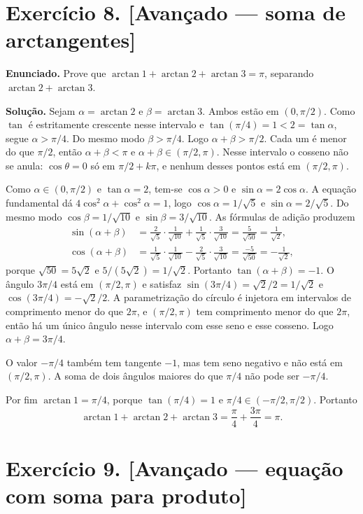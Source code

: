 \documentclass[11pt,a4paper]{article}
\begin{document}
\section*{Exercício 8. [Avançado --- soma de arctangentes]}

\textbf{Enunciado.} Prove que $\arctan 1+\arctan 2+\arctan 3=\pi$, separando $\arctan 2+\arctan 3$.

\textbf{Solução.}
Sejam $\alpha=\arctan 2$ e $\beta=\arctan 3$. Ambos estão em $(0,\pi/2)$. Como $\tan$ é estritamente crescente nesse intervalo e $\tan(\pi/4)=1<2=\tan\alpha$, segue $\alpha>\pi/4$. Do mesmo modo $\beta>\pi/4$. Logo $\alpha+\beta>\pi/2$. Cada um é menor do que $\pi/2$, então $\alpha+\beta<\pi$ e $\alpha+\beta\in(\pi/2,\pi)$. Nesse intervalo o cosseno não se anula: $\cos\theta=0$ só em $\pi/2+k\pi$, e nenhum desses pontos está em $(\pi/2,\pi)$.

Como $\alpha\in(0,\pi/2)$ e $\tan\alpha=2$, tem-se $\cos\alpha>0$ e $\sin\alpha=2\cos\alpha$. A equação fundamental dá $4\cos^2\alpha+\cos^2\alpha=1$, logo $\cos\alpha=1/\sqrt{5}$ e $\sin\alpha=2/\sqrt{5}$. Do mesmo modo $\cos\beta=1/\sqrt{10}$ e $\sin\beta=3/\sqrt{10}$. As fórmulas de adição produzem
\begin{align*}
\sin(\alpha+\beta)
&=\frac{2}{\sqrt{5}}\cdot\frac{1}{\sqrt{10}}+\frac{1}{\sqrt{5}}\cdot\frac{3}{\sqrt{10}}
=\frac{5}{\sqrt{50}}
=\frac{1}{\sqrt{2}},\\
\cos(\alpha+\beta)
&=\frac{1}{\sqrt{5}}\cdot\frac{1}{\sqrt{10}}-\frac{2}{\sqrt{5}}\cdot\frac{3}{\sqrt{10}}
=\frac{-5}{\sqrt{50}}
=-\frac{1}{\sqrt{2}},
\end{align*}
porque $\sqrt{50}=5\sqrt{2}$ e $5/(5\sqrt{2})=1/\sqrt{2}$. Portanto $\tan(\alpha+\beta)=-1$. O ângulo $3\pi/4$ está em $(\pi/2,\pi)$ e satisfaz $\sin(3\pi/4)=\sqrt{2}/2=1/\sqrt{2}$ e $\cos(3\pi/4)=-\sqrt{2}/2$. A parametrização do círculo é injetora em intervalos de comprimento menor do que $2\pi$, e $(\pi/2,\pi)$ tem comprimento menor do que $2\pi$, então há um único ângulo nesse intervalo com esse seno e esse cosseno. Logo $\alpha+\beta=3\pi/4$.

O valor $-\pi/4$ também tem tangente $-1$, mas tem seno negativo e não está em $(\pi/2,\pi)$. A soma de dois ângulos maiores do que $\pi/4$ não pode ser $-\pi/4$.

Por fim $\arctan 1=\pi/4$, porque $\tan(\pi/4)=1$ e $\pi/4\in(-\pi/2,\pi/2)$. Portanto
\[
\arctan 1+\arctan 2+\arctan 3=\frac{\pi}{4}+\frac{3\pi}{4}=\pi.
\]

\section*{Exercício 9. [Avançado --- equação com soma para produto]}
\end{document}
